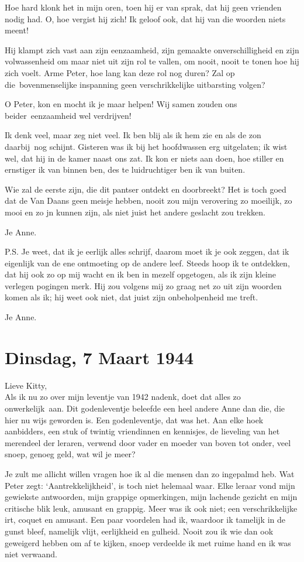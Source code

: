 \documentclass{book}
\begin{document}
Hoe hard klonk het in mijn oren, toen hij er van sprak, dat hij geen
vrienden nodig had. O, hoe vergist hij zich! Ik geloof ook, dat hij van
die woorden niets meent!

Hij klampt zich vast aan zijn eenzaamheid, zijn gemaakte
onverschilligheid en zijn volwassenheid om maar niet uit zijn rol te
vallen, om nooit, nooit te tonen hoe hij zich voelt. Arme Peter, hoe
lang kan deze rol nog duren? Zal op die~bovenmenselijke inspanning geen
verschrikkelijke uitbarsting volgen?

O Peter, kon en mocht ik je maar helpen! Wij samen zouden ons
beider~eenzaamheid wel verdrijven!

Ik denk veel, maar zeg niet veel. Ik ben blij als ik hem zie en als de
zon daarbij~nog schijnt. Gisteren was ik bij het hoofdwassen erg
uitgelaten; ik wist wel, dat hij in de kamer naast ons zat. Ik kon er
niets aan doen, hoe stiller en ernstiger ik van binnen ben, des te
luidruchtiger ben ik van buiten.

Wie zal de eerste zijn, die dit pantser ontdekt en doorbreekt? Het is
toch goed dat de Van Daans geen meisje hebben, nooit zou mijn verovering
zo moeilijk, zo mooi en zo jn kunnen zijn, als niet juist het andere
geslacht zou trekken.

Je Anne.

P.S. Je weet, dat ik je eerlijk alles schrijf, daarom moet ik je ook
zeggen, dat ik eigenlijk van de ene ontmoeting op de andere leef. Steeds
hoop ik te ontdekken, dat hij ook zo op mij wacht en ik ben in mezelf
opgetogen, als ik zijn kleine verlegen pogingen merk. Hij zou volgens
mij zo graag net zo uit zijn woorden komen als ik; hij weet ook niet,
dat juist zijn onbeholpenheid me treft.

Je Anne.

\chapter{Dinsdag, 7 Maart 1944}

Lieve Kitty,\\Als ik nu zo over mijn leventje van 1942 nadenk, doet dat
alles zo onwerkelijk~aan. Dit godenleventje beleefde een heel andere
Anne dan die, die hier nu wijs geworden is. Een godenleventje, dat was
het. Aan elke hoek aanbidders, een stuk of twintig vriendinnen en
kennisjes, de lieveling van het merendeel der leraren, verwend door
vader en moeder van boven tot onder, veel snoep, genoeg geld, wat wil je
meer?

Je zult me allicht willen vragen hoe ik al die mensen dan zo ingepalmd
heb. Wat Peter zegt: `Aantrekkelijkheid', is toch niet helemaal waar.
Elke leraar vond mijn gewiekste antwoorden, mijn grappige opmerkingen,
mijn lachende gezicht en mijn critische blik leuk, amusant en grappig.
Meer was ik ook niet; een verschrikkelijke irt, coquet en amusant. Een
paar voordelen had ik, waardoor ik tamelijk in de gunst bleef, namelijk
vlijt, eerlijkheid en gulheid. Nooit zou ik wie dan ook geweigerd hebben
om af te kijken, snoep verdeelde ik met ruime hand en ik was niet
verwaand.
\end{document}
